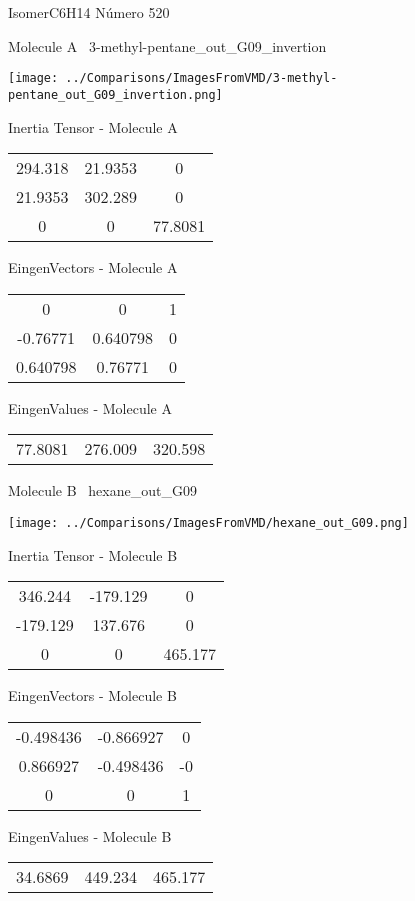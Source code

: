 \vtab[-3cm]
\begin{center}
{\large IsomerC6H14 \tab Número 520}
\end{center}
\begin{multicols}{2}
\begin{center}

Molecule A \
3-methyl-pentane\_out\_G09\_invertion

\texttt{[image: ../Comparisons/ImagesFromVMD/3-methyl-pentane\_out\_G09\_invertion.png]}

Inertia Tensor - Molecule A \\
\begin{tabular}{|c c c|}
294.318	 & 	21.9353	 & 	0	 \\
21.9353	 & 	302.289	 & 	0	 \\
0	 & 	0	 & 	77.8081
\end{tabular}

\vtab
 EingenVectors - Molecule A     \\
\begin{tabular}{|c c c|}
0	 & 	0	 & 	1	 \\
-0.76771	 & 	0.640798	 & 	0	 \\
0.640798	 & 	0.76771	 & 	0
\end{tabular}

\vtab
 EingenValues - Molecule A     \\
\begin{tabular}{|c c c|}
77.8081	 & 	276.009	 & 	320.598	 \\
\end{tabular}
\columnbreak

Molecule B \
hexane\_out\_G09

\texttt{[image: ../Comparisons/ImagesFromVMD/hexane\_out\_G09.png]}

Inertia Tensor - Molecule B \\
\begin{tabular}{|c c c|}
346.244	 & 	-179.129	 & 	0	 \\
-179.129	 & 	137.676	 & 	0	 \\
0	 & 	0	 & 	465.177
\end{tabular}

\vtab
 EingenVectors - Molecule B     \\
\begin{tabular}{|c c c|}
-0.498436	 & 	-0.866927	 & 	0	 \\
0.866927	 & 	-0.498436	 & 	-0	 \\
0	 & 	0	 & 	1
\end{tabular}

\vtab
 EingenValues - Molecule B     \\
\begin{tabular}{|c c c|}
34.6869	 & 	449.234	 & 	465.177	 \\
\end{tabular}

\end{center}
\end{multicols}

